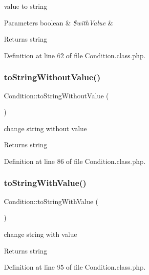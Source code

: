 value to string 
\begin{DoxyParams}[1]{Parameters}
boolean & {\em \$with\+Value} & \\
\hline
\end{DoxyParams}
\begin{DoxyReturn}{Returns}
string 
\end{DoxyReturn}


Definition at line 62 of file Condition.\+class.\+php.

\hypertarget{classCondition_ae472caca5533fe0442eb56fe38cc8ef1}{}\label{classCondition_ae472caca5533fe0442eb56fe38cc8ef1} 
\subsubsection{\texorpdfstring{to\+String\+Without\+Value()}{toStringWithoutValue()}}
{\footnotesize\ttfamily Condition\+::to\+String\+Without\+Value (\begin{DoxyParamCaption}{ }\end{DoxyParamCaption})}

change string without value \begin{DoxyReturn}{Returns}
string 
\end{DoxyReturn}


Definition at line 86 of file Condition.\+class.\+php.

\hypertarget{classCondition_ac15dfd53b971b98fd34b7cfff99ab4c8}{}\label{classCondition_ac15dfd53b971b98fd34b7cfff99ab4c8} 
\subsubsection{\texorpdfstring{to\+String\+With\+Value()}{toStringWithValue()}}
{\footnotesize\ttfamily Condition\+::to\+String\+With\+Value (\begin{DoxyParamCaption}{ }\end{DoxyParamCaption})}

change string with value \begin{DoxyReturn}{Returns}
string 
\end{DoxyReturn}


Definition at line 95 of file Condition.\+class.\+php.



